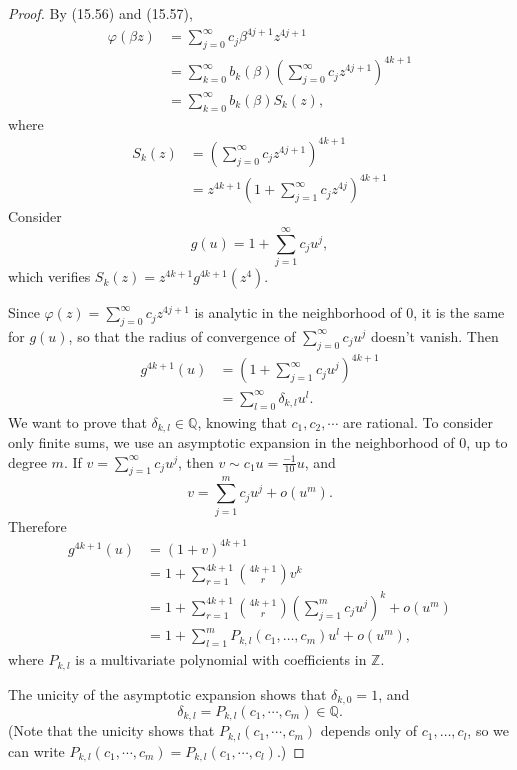 \documentclass[11pt,a4paper]{article}
\newcommand{\Q}{\mathbb{Q}}
\newcommand{\Z}{\mathbb{Z}}
\begin{document}
\begin{proof} 
By (15.56) and (15.57),
\begin{align*}
\varphi(\beta z) &= \sum_{j=0}^\infty c_j \beta^{4j+1} z^{4j+1}\\
&= \sum_{k=0}^\infty b_k(\beta) \left( \sum_{j=0}^\infty c_j z^{4j+1}\right)^{4k+1}\\
&=  \sum_{k=0}^\infty b_k(\beta) S_k(z),
\end{align*}
where
\begin{align*}
S_k(z) &= \left( \sum_{j=0}^\infty c_j z^{4j+1}\right)^{4k+1}\\
&=z^{4k+1}\left(1 + \sum_{j=1}^\infty c_j z^{4j}\right)^{4k+1}
\end{align*}
Consider
$$g(u) = 1 + \sum_{j=1}^\infty c_ju^j, $$
which verifies $S_k(z) = z^{4k+1} g^{4k+1}(z^4)$.

Since $\varphi(z) = \sum_{j=0}^\infty c_jz^{4j+1}$ is analytic in the neighborhood of $0$, it is the same for $g(u)$, so that the radius of convergence of $ \sum_{j=0}^\infty c_ju^j$ doesn't vanish. Then
\begin{align*}
g^{4k+1}(u) &= \left(1 + \sum_{j=1}^\infty c_ju^j\right)^{4k+1}\\
&=\sum_{l=0}^\infty \delta_{k,l}u^l.
\end{align*}
We want to prove that $\delta_{k,l} \in \Q$, knowing that $c_1,c_2,\cdots $ are rational.
To consider only finite sums, we use an asymptotic expansion in the neighborhood of $0$, up to  degree $m$.
If $v =\sum_{j=1}^\infty c_ju^j$, then $v \sim c_1u = \frac{-1}{10}u$, and
$$v = \sum_{j=1}^m c_ju^j + o(u^m).$$
Therefore
\begin{align*}
g^{4k+1}(u) &= (1+v)^{4k+1}\\
&=1 + \sum_{r=1}^{4k+1} \binom{4k+1}{r} v^k\\
&=1 + \sum_{r=1}^{4k+1} \binom{4k+1}{r} \left(\sum_{j=1}^m c_ju^j\right)^k  + o(u^m)\\
&= 1 + \sum_{l=1}^m P_{k,l}(c_1,\ldots,c_m) u^l + o(u^m),
\end{align*}
where $P_{k,l}$ is a multivariate polynomial with coefficients in $\Z$. 

The unicity of the asymptotic expansion shows that $\delta_{k,0} = 1$, and 
$$\delta_{k,l} = P_{k,l}(c_1,\cdots,c_m) \in \Q.$$
(Note that the unicity shows that $P_{k,l}(c_1,\cdots,c_m)$ depends only of $c_1,\ldots, c_l$, so we can write $P_{k,l}(c_1,\cdots,c_m) = P_{k,l}(c_1,\cdots,c_l)$.)


\end{proof}
\end{document}
